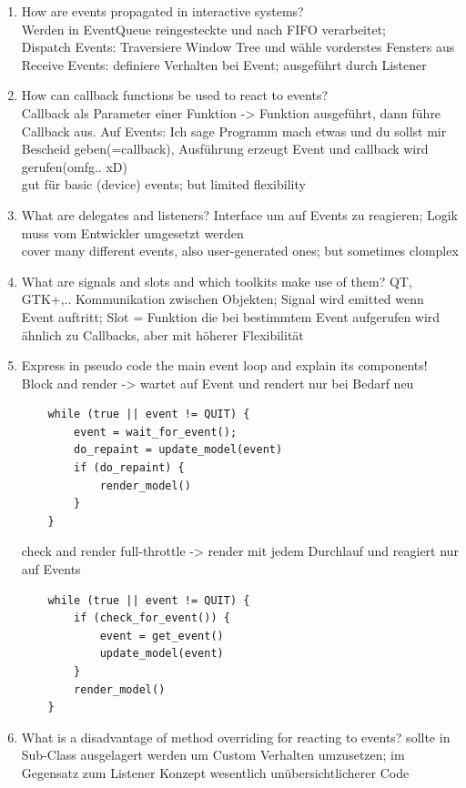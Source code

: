 \begin{enumerate}
	\item How are events propagated in interactive systems?\\
	Werden in EventQueue reingesteckte und nach FIFO verarbeitet;\\
	Dispatch Events: Traversiere Window Tree und wähle vorderstes Fensters aus\\
	Receive Events: definiere Verhalten bei Event; ausgeführt durch Listener
	
	\item How can callback functions be used to react to events?\\
	Callback als Parameter einer Funktion -> Funktion ausgeführt, dann führe Callback aus. Auf Events: Ich sage Programm mach etwas und du sollst mir Bescheid geben(=callback), Ausführung erzeugt Event und callback wird gerufen(omfg.. xD)\\
	gut für basic (device) events; but limited flexibility
	
	\item What are delegates and listeners?
	Interface um auf Events zu reagieren; Logik muss vom Entwickler umgesetzt werden\\
	cover many different events, also user-generated ones; but sometimes clomplex
	
	\item What are signals and slots and which toolkits make use of them?
	QT, GTK+,.. Kommunikation zwischen Objekten; Signal wird emitted wenn Event auftritt; Slot = Funktion die bei bestimmtem Event aufgerufen wird\\
	ähnlich zu Callbacks, aber mit höherer Flexibilität
	
	\item Express in pseudo code the main event loop and explain its components!\\
	Block and render -> wartet auf Event und rendert nur bei Bedarf neu
	\begin{lstlisting}
	while (true || event != QUIT) {
		event = wait_for_event();
		do_repaint = update_model(event)
		if (do_repaint) {
			render_model()
		}
	}
	\end{lstlisting}
	check and render full-throttle -> render mit jedem Durchlauf und reagiert nur auf Events
	\begin{lstlisting}
	while (true || event != QUIT) {
		if (check_for_event()) {
			event = get_event()
			update_model(event)
		}
		render_model()
	}
	\end{lstlisting}
		
	\item What is a disadvantage of method overriding for reacting to events?
	sollte in Sub-Class ausgelagert werden um Custom Verhalten umzusetzen; im Gegensatz zum Listener Konzept wesentlich unübersichtlicherer Code
\end{enumerate}


